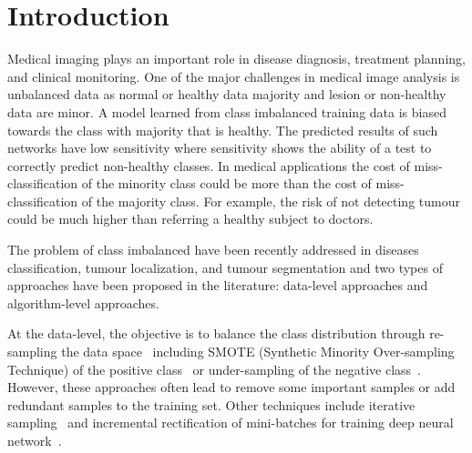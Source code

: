\documentclass[10pt,twocolumn,letterpaper]{article}
\begin{document}
\section{Introduction}\label{intro}
Medical imaging plays an important role in disease diagnosis, treatment planning, and clinical monitoring. One of the major challenges in medical image analysis is unbalanced data as normal or healthy data majority and lesion or non-healthy data are minor. A model learned from class imbalanced training data is biased towards the class with majority that is healthy. The predicted results of such networks have low sensitivity where sensitivity shows the ability of a test to correctly predict non-healthy classes. In medical applications the cost of miss-classification of the minority class could be more than the cost of miss-classification of the majority class. For example, the risk of not detecting tumour could be much higher than referring a healthy subject to doctors.

The problem of class imbalanced have been recently addressed in diseases classification, tumour localization, and tumour segmentation and two types of approaches have been proposed in the literature: data-level approaches and algorithm-level approaches.

At the data-level, the objective is to balance the class distribution through re-sampling the data space~\cite{kohli2017medical} including SMOTE (Synthetic Minority Over-sampling Technique) of the positive class~\cite{douzas2018effective,mariani2018bagan} or under-sampling of the negative class~\cite{6914453}.
However, these approaches often lead to remove some important samples or add redundant samples to the training set.
Other techniques include iterative sampling~\cite{morales2012image} and incremental rectification of mini-batches for training deep neural network~\cite{dong2018imbalanced}.
\end{document}
